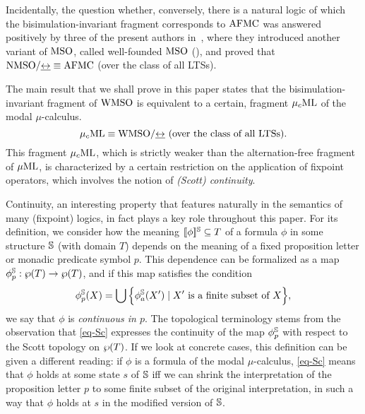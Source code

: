 Incidentally, the question whether, conversely, there is a natural logic of
which the
bisimulation-invariant fragment corresponds to $\mathrm{AFMC}$ was answered positively
by three of the present authors in~\cite{DBLP:conf/lics/FacchiniVZ13}, where they introduced
another variant of $\mathrm{MSO}$, called well-founded $\mathrm{MSO}$ (\nmso), and proved
that $\mathrm{NMSO}/{\mathrel{\underline{\leftrightarrow}}} \equiv \mathrm{AFMC}$ (over the class of all LTSs).

The main result that we shall prove in this paper states that the
bisimulation-invariant fragment of $\mathrm{WMSO}$ is equivalent to a certain,
fragment $\mu_{c}\textup{ML}$ of the modal $\mu$-calculus.
\begin{equation}
\label{eq-main}
\mucML \equiv \wmso/{\bis}  \text{ (over the class of all LTSs)}.
\end{equation}
This fragment $\mu_{c}\textup{ML}$, which is strictly weaker than the alternation-free fragment
of $\mu\mathrm{ML}$, is characterized by a certain restriction on the application of
fixpoint operators, which involves the notion of \emph{(Scott) continuity}.

Continuity, an interesting property that features naturally in the semantics
of many (fixpoint) logics, in fact plays a key role throughout this paper.
For its definition, we consider how the meaning $[\![\phi]\!]^{\mathbb{S}} \subseteq T$
of a formula $\phi$ in some structure $\mathbb{S}$ (with domain $T$) depends on the meaning of a fixed
proposition letter or monadic predicate symbol $p$.
This dependence can be formalized as a map $\phi^{\mathbb{S}}_{p}: \wp(T) \to
\wp (T)$, and if this map satisfies the condition
\begin{equation}
\label{eq-Sc}
\phi^{\model}_{p}(X) = \bigcup \Big\{ \phi^{\model}_{a}(X') \mid X'
\text{ is a finite subset of } X \Big\},
\end{equation}
we say that $\phi$ is \emph{continuous in $p$}.
The topological terminology stems from the observation that \eqref{eq-Sc}
expresses the continuity of the map $\phi^{\mathbb{S}}_{p}$ with respect to the Scott
topology on $\wp(T)$. %
If we look at concrete cases, this definition can be given a different reading:
if $\phi$ is a formula of the
modal $\mu$-calculus, \eqref{eq-Sc} means that $\phi$ holds at some state $s$
of $\mathbb{S}$ iff we can shrink the interpretation of the proposition letter $p$
to some finite subset of the original interpretation, in such a way that
$\phi$ holds at $s$ in the modified version of $\mathbb{S}$.

